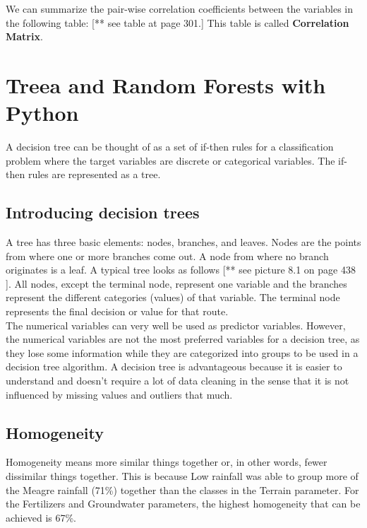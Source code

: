 \documentclass{article}
\numberwithin{equation}{section} %
\begin{document}
We can summarize the pair-wise correlation coefficients between the variables in the
following table: [** see table at page 301.] This table is called \textbf{Correlation Matrix}.\\


\newpage

\section*{Treea and Random Forests with Python}

A decision tree can be thought of as a set of if-then rules for a classification problem where the target variables are discrete or categorical variables. The if-then rules are represented as a tree. 

\subsection*{Introducing decision trees}

A tree has three basic elements: nodes, branches, and leaves. Nodes are the points from where one or more branches come out. A node from where no branch originates is a leaf. A typical tree looks as follows [** see picture 8.1 on page 438 ].  All
nodes, except the terminal node, represent one variable and the branches represent
the different categories (values) of that variable. The terminal node represents the
final decision or value for that route. \\

The numerical variables can very well be used as predictor variables. However, the numerical variables are not the most preferred variables for a decision tree, as they lose some information while they are categorized into groups to be used in a decision tree algorithm. A decision tree is advantageous because it is easier to understand and doesn't require a lot of data cleaning in the sense that it is not influenced by missing values and outliers that much. \\

\subsection*{Homogeneity}

Homogeneity means more similar things together or, in other words, fewer dissimilar things together. This is because Low rainfall was able to group more of the Meagre rainfall (71\%) together than the classes in the Terrain parameter. For the Fertilizers and Groundwater parameters, the highest homogeneity that can be achieved is 67\%. \\
\end{document}

